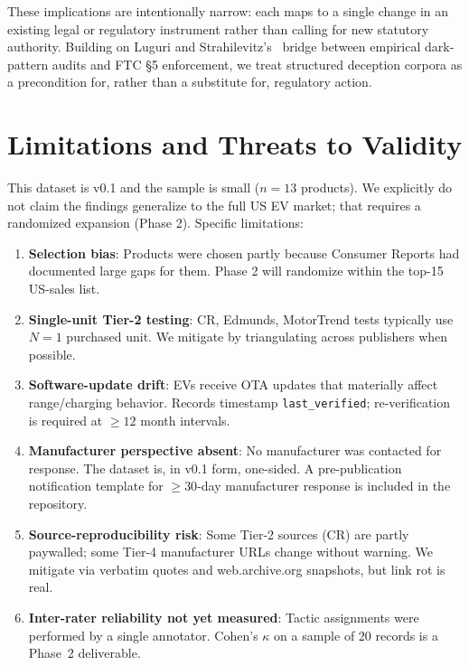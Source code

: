 \documentclass{article}
\begin{document}
These implications are intentionally narrow: each maps to a single change in an existing legal or regulatory instrument rather than calling for new statutory authority. Building on Luguri and Strahilevitz's~\cite{luguri_darkpatterns_2021} bridge between empirical dark-pattern audits and FTC \S 5 enforcement, we treat structured deception corpora as a precondition for, rather than a substitute for, regulatory action.

\section{Limitations and Threats to Validity}\label{sec:limits}

This dataset is v0.1 and the sample is small ($n=13$ products). We explicitly do not claim the findings generalize to the full US EV market; that requires a randomized expansion (Phase 2). Specific limitations:

\begin{enumerate}
  \item \textbf{Selection bias}: Products were chosen partly because Consumer Reports had documented large gaps for them. Phase 2 will randomize within the top-15 US-sales list.
  \item \textbf{Single-unit Tier-2 testing}: CR, Edmunds, MotorTrend tests typically use $N=1$ purchased unit. We mitigate by triangulating across publishers when possible.
  \item \textbf{Software-update drift}: EVs receive OTA updates that materially affect range/charging behavior. Records timestamp \texttt{last\_verified}; re-verification is required at $\geq 12$ month intervals.
  \item \textbf{Manufacturer perspective absent}: No manufacturer was contacted for response. The dataset is, in v0.1 form, one-sided. A pre-publication notification template for $\geq 30$-day manufacturer response is included in the repository.
  \item \textbf{Source-reproducibility risk}: Some Tier-2 sources (CR) are partly paywalled; some Tier-4 manufacturer URLs change without warning. We mitigate via verbatim quotes and web.archive.org snapshots, but link rot is real.
  \item \textbf{Inter-rater reliability not yet measured}: Tactic assignments were performed by a single annotator. Cohen's $\kappa$ on a sample of 20 records is a Phase~2 deliverable.
\end{enumerate}
\end{document}

